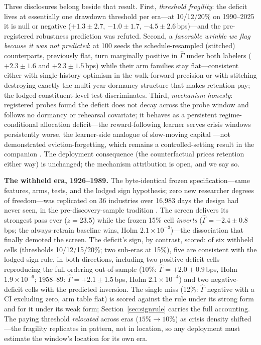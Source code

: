 \documentclass[sigconf,anonymous]{acmart}
\newcommand{\G}{\hat\Gamma}
\begin{document}
Three disclosures belong beside that result. First, \emph{threshold
fragility}: the deficit lives at essentially one drawdown threshold per
era---at 10/12/20\% on 1990--2025 it is null or negative
($+1.3 \pm 2.7$, $-1.0 \pm 1.7$, $-4.5 \pm 2.6$\,bps)---and the
pre-registered robustness prediction
was refuted. Second, a \emph{favorable wrinkle we flag because it was
not predicted}: at 100 seeds the schedule-resampled (stitched)
counterparts, previously flat, turn marginally positive in $\G$ under
both labelers ($+2.3 \pm 1.6$ and $+2.3 \pm 1.5$\,bps)
while their arm families stay flat---consistent either with
single-history optimism in the walk-forward precision or with
stitching destroying exactly the multi-year dormancy structure that
makes retention pay; the lodged constituent-level test discriminates.
Third, \emph{mechanism honesty}: registered probes found
the deficit does not decay across the probe window and follows no
dormancy or rehearsal covariate; it behaves as a persistent
regime-conditional allocation deficit---the reward-following learner
serves crisis windows persistently worse, the learner-side analogue of
slow-moving capital \cite{duffie2010presidential,mitchell2007slow}---not
demonstrated eviction-forgetting, which remains a controlled-setting
result in the companion \cite{companion2026}. The deployment
consequence (the counterfactual prices retention either way) is
unchanged; the mechanism attribution is open, and we say so.

{\sloppy
\textbf{The withheld era, 1926--1989.} The byte-identical frozen
specification---same features, arms, tests, and the lodged sign
hypothesis; zero new researcher degrees of freedom---was replicated on
36 industries over 16{,}983 days the design had never seen, in the
pre-discovery-sample tradition \cite{linnainmaa2018history,
goyal2008comprehensive}. The screen delivers its strongest pass ever
($z = 23.5$) while the frozen 15\% cell \emph{inverts}
($\G = -2.4 \pm 0.8$\,bps; the always-retrain baseline wins, Holm
$2.1{\times}10^{-3}$)---the dissociation that finally demoted the
screen. The deficit's sign, by contrast, scored: of six withheld cells
(thresholds 10/12/15/20\%; two sub-eras at 15\%), five are consistent
with the lodged sign rule, in both directions, including two
positive-deficit cells reproducing the full ordering out-of-sample
(10\%: $\G = +2.0 \pm 0.9$\,bps, Holm $1.9{\times}10^{-6}$;
1958--89: $\G = +2.1 \pm 1.5$\,bps, Holm $2.1{\times}10^{-4}$) and
two negative-deficit cells with the predicted inversion. The single
miss (12\%: $\G$ negative with a CI excluding zero, arm table flat) is scored against
the rule under its strong form and for it under its weak form;
Section~\ref{sec:signrule} carries the full accounting. The paying
threshold \emph{relocated} across eras ($15\% \to 10\%$) as crisis
density shifted---the fragility replicates in pattern, not in location,
so any deployment must estimate the window's location for its own era.
\par}
\end{document}
